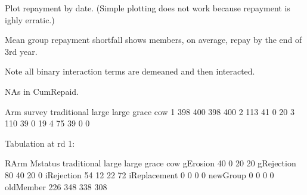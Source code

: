 Plot repayment by date. (Simple plotting does not work because repayment is ighly erratic.)


Mean group repayment shortfall shows members, on average, repay by the end of 3rd year.




Note all binary interaction terms are demeaned and then interacted.

NAs in \textsf{CumRepaid}.
\begin{Schunk}
\begin{Soutput}
      Arm
survey traditional large large grace cow
     1         398   400         398 400
     2         113    41           0  20
     3         110    39           0  19
     4          75    39           0   0
\end{Soutput}
\end{Schunk}
Tabulation at rd 1:
\begin{Schunk}
\begin{Soutput}
              RArm
Mstatus        traditional large large grace cow
  gErosion              40     0          20  20
  gRejection            80    40          20   0
  iRejection            54    12          22  72
  iReplacement           0     0           0   0
  newGroup               0     0           0   0
  oldMember            226   348         338 308
\end{Soutput}
\end{Schunk}











